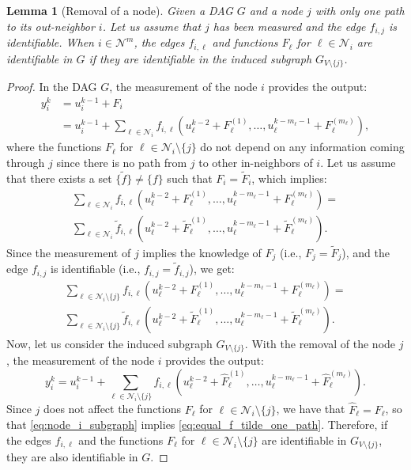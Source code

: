 \documentclass[letterpaper,10pt,journal]{IEEEtran}
\newtheorem{lemma}{Lemma}
\newcommand{\NN}{\mathcal{N}}
\begin{document}
\begin{lemma}[Removal of a node]\label{lemma:removal_node}
    Given a DAG $G$ and a node $j$ with only one path to its out-neighbor $i$. Let us assume that $j$ has been measured and the edge $f_{i,j}$ is identifiable. When $i\in \NN^m$, the edges $f_{i,\ell}$ and functions $F_\ell$ for $\ell\in\NN_i$ are identifiable in $G$ if they are identifiable in the induced subgraph   
    $G_{V\setminus\{ j\}}$.
\end{lemma}
\begin{proof}
In the DAG $G$, the measurement of the node $i$ provides the output:
\begin{align}
  y_i^k&=u_i^{k-1}+F_i\nonumber\\
  &=u_i^{k-1}+ \sum_{\ell\in\NN_i}f_{i,\ell}(u_{\ell}^{k-2}+ F_{\ell}^{(1)},\ldots,u_{\ell}^{k-m_{\ell}-1}+ F_{\ell}^{(m_{\ell})}),   \label{eq:measure_one_path}
\end{align}
    where the functions $F_\ell$ for $\ell\in\NN_i\setminus \{ j \}$ do not depend on any information coming through $j$ since there is no path from $j$ to other in-neighbors of $i$.
   Let us assume that there exists a set $\{\tilde f\}\neq \{ f\}$ such that $F_i=\tilde F_i$, which implies:
    \begin{multline*}
        \sum_{\ell\in\NN_i}f_{i,\ell}(u_{\ell}^{k-2}+F_{\ell}^{(1)},\ldots,u_{\ell}^{k-m_{\ell}-1}+F_{\ell}^{(m_{\ell})})=\\
        \sum_{\ell\in\NN_i}\tilde f_{i,\ell}(u_{\ell}^{k-2}+\tilde F_{\ell}^{(1)},\ldots,u_{\ell}^{k-m_{\ell}-1}+\tilde F_{\ell}^{(m_{\ell})}).
    \end{multline*}
    Since the measurement of $j$ implies the knowledge of $F_j$ (i.e., $F_j=\tilde F_j$), and the edge $f_{i,j}$ is identifiable (i.e., $f_{i,j}=\tilde f_{i,j}$), we get:   \begin{multline}\label{eq:equal_f_tilde_one_path}
        \sum_{\ell\in\NN_i\setminus\{ j\}}f_{i,\ell}(u_{\ell}^{k-2}+F_{\ell}^{(1)},\ldots,u_{\ell}^{k-m_{\ell}-1}+F_{\ell}^{(m_{\ell})})=\\
        \sum_{\ell\in\NN_i\setminus\{ j \}}\tilde f_{i,\ell}(u_{\ell}^{k-2}+\tilde F_{\ell}^{(1)},\ldots,u_{\ell}^{k-m_{\ell}-1}+\tilde F_{\ell}^{(m_{\ell})}).
    \end{multline}
    Now, let us consider the induced subgraph $G_{V\setminus\{ j \}}$. With the removal of the node $j$, the measurement of the node $i$ provides the output:
    \begin{equation}\label{eq:node_i_subgraph}
    y_i^k=u_i^{k-1}+ \sum_{\ell\in\NN_i\setminus\{ j\}}f_{i,\ell}(u_{\ell}^{k-2}+\hat F_{\ell}^{(1)},\ldots,u_{\ell}^{k-m_{\ell}-1}+\hat F_{\ell}^{(m_{\ell})}).    
    \end{equation}
    Since $j$ does not affect the functions $F_\ell$ for $\ell\in\NN_i\setminus \{ j \}$, we have that $\hat F_\ell=F_\ell$, so that \eqref{eq:node_i_subgraph} implies \eqref{eq:equal_f_tilde_one_path}. Therefore, if the edges $f_{i,\ell}$ and the functions $F_\ell$ for $\ell\in\NN_i\setminus\{j\}$ are identifiable in $G_{V\setminus\{ j \}}$, they are also identifiable in $G$. 
\end{proof}
\end{document}
